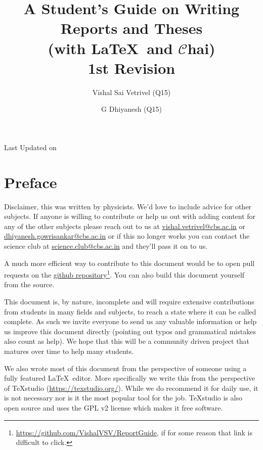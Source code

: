 \documentclass[english,10pt,a4paper, openany, oneside]{book}
\title{{\asciifamily\Huge \textbf{A Student's Guide on Writing \\Reports and Theses} \\{\large (with \LaTeX\ and $\mathcal{C}$hai)} \bigskip\\ {\normalsize 1st Revision}}}
\author{Vishal Sai Vetrivel (Q15) \and G Dhiyanesh (Q15)}
\begin{document}
	\frontmatter
	{\let\cleardoublepage\clearpage 
		
		\begin{titlepage}
			\makeatletter
			\begin{center}
				\vspace*{5cm} 
				\@title   
				\vfill
                \theauthor
                \smallskip
                
				{\small Last Updated on \@date}
			\end{center}
			\makeatother
		\end{titlepage}
		
		
		\chapter{Preface}
		Disclaimer, this was written by physicists. We'd love to include advice for other subjects. If anyone is willing to contribute or help us out with adding content for any of the other subjects please reach out to us at \href{mailto:vishal.vetrivel@cbs.ac.in}{vishal.vetrivel@cbs.ac.in} or \href{mailto:dhiyanesh.gowrisankar@cbs.ac.in}{dhiyanesh.gowrisankar@cbs.ac.in} or if this no longer works you can contact the science club at \href{mailto:science.club@cbs.ac.in}{science.club@cbs.ac.in} and they'll pass it on to us. 

        A much more efficient way to contribute to this document would be to open pull requests on the \href{https://github.com/VishalVSV/ReportGuide}{github repository}\footnote{\url{https://github.com/VishalVSV/ReportGuide}, if for some reason that link is difficult to click.}. You can also build this document yourself from the source.

		This document is, by nature, incomplete and will require extensive contributions from students in many fields and subjects, to reach a state where it can be called complete. As such we invite everyone to send us any valuable information or help us improve this document directly (pointing out typos and grammatical mistakes also count as help). We hope that this will be a community driven project that matures over time to help many students.
		
		We also wrote most of this document from the perspective of someone using a fully featured \LaTeX\ editor. More specifically we write this from the perspective of TeXstudio (\url{https://texstudio.org/}). While we do recommend it for daily use, it is not necessary nor is it the most popular tool for the job. TeXstudio is also open source and uses the GPL v2 license which makes it free software. 
		
}
\end{document}
